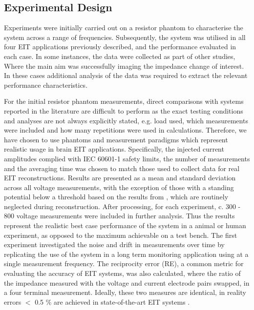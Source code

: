 \subsection{Experimental Design}

Experiments were initially carried out on a resistor phantom to characterise the system across a range of frequencies. Subsequently, the system was utilised in all four EIT applications previously described, and the performance evaluated in each case. In some instances, the data were collected as part of other studies, Where the main aim was successfully imaging the impedance change of interest. In these cases additional analysis of the data was required to extract the relevant performance characteristics.

For the initial resistor phantom measurements, direct comparisons with systems reported in the literature are difficult to perform as the exact testing conditions and analyses are not always explicitly stated, e.g. load used, which measurements were included and how many repetitions were used in calculations. Therefore, we have chosen to use phantoms and measurement paradigms which represent realistic usage in brain EIT applications. Specifically, the injected current amplitudes complied with IEC 60601-1 \cite{IEC} safety limits, the number of measurements and the averaging time was chosen to match those used to collect data for real EIT reconstructions. Results are presented as a mean and standard deviation across all voltage measurements, with the exception of those with a standing potential below a threshold based on the results from \citet{packham2012comparison}, which are routinely neglected during reconstruction. After processing, for each experiment, c. 300 - 800 voltage measurements were included in further analysis. Thus the results represent the realistic best case performance of the system in a animal or human experiment, as opposed to the maximum achievable on a test bench. The first experiment investigated the noise and drift in measurements over time by replicating the use of the system in a long term monitoring application using at a single measurement frequency. The reciprocity error (RE), a common metric for evaluating the accuracy of EIT systems, was also calculated, where the ratio of the impedance measured with the voltage and current electrode pairs swapped, in a four terminal measurement. Ideally, these two measures are identical, in reality errors $<$ 0.5 \% are achieved in state-of-the-art EIT systems \cite{Hun_Wi_2014}. 

